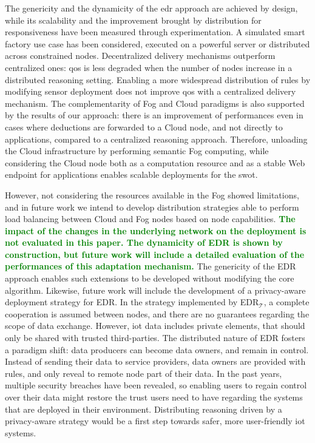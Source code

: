 \documentclass{iosart2c}
\newcommand{\edr}{EDR\xspace}
\newcommand{\edrt}{EDR$_{\mathcal{T}}$\xspace}
\newcommand{\added}[1]{\textcolor{green}{\textbf{#1}}}
\begin{document}
The genericity and the dynamicity of the \gls{edr} approach are achieved by design, while its scalability and the improvement brought by distribution for responsiveness have been measured through experimentation.
A simulated smart factory use case has been considered, executed on a powerful server or distributed across constrained nodes.
Decentralized delivery mechanisms outperform centralized ones: \gls{qos} is less degraded when the number of nodes increase in a distributed reasoning setting.
Enabling a more widespread distribution of rules by modifying sensor deployment does not improve \gls{qos} with a centralized delivery mechanism.
The complementarity of Fog and Cloud paradigms is also supported by the results of our approach: there is an improvement of performances even in cases where deductions are forwarded to a Cloud node, and not directly to applications, compared to a centralized reasoning approach.
Therefore, unloading the Cloud infrastructure by performing semantic Fog computing, while considering the Cloud node both as a computation resource and as a stable Web endpoint for applications enables scalable deployments for the \gls{swot}.

However, not considering the resources available in the Fog showed limitations, and in future work we intend to develop distribution strategies able to perform load balancing between Cloud and Fog nodes based on node capabilities.
\added{
The impact of the changes in the underlying network on the deployment is not evaluated in this paper.
The dynamicity of \edr is shown by construction, but future work will include a detailed evaluation of the performances of this adaptation mechanism.
}
The genericity of the \edr approach enables such extensions to be developed without modifying the core algorithm.
Likewise, future work will include the development of a privacy-aware deployment strategy for \edr.
In the strategy implemented by \edrt, a complete cooperation is assumed between nodes, and there are no guarantees regarding the scope of data exchange.
However, \gls{iot} data includes private elements, that should only be shared with trusted third-parties.
The distributed nature of \edr fosters a paradigm shift: data producers can become data owners, and remain in control. 
Instead of sending their data to service providers, data owners are provided with rules, and only reveal to remote node part of their data.
In the past years, multiple security breaches have been revealed, so enabling users to regain control over their data might restore the trust users need to have regarding the systems that are deployed in their environment.
Distributing reasoning driven by a privacy-aware strategy would be a first step towards safer, more user-friendly \gls{iot} systems.
\end{document}
